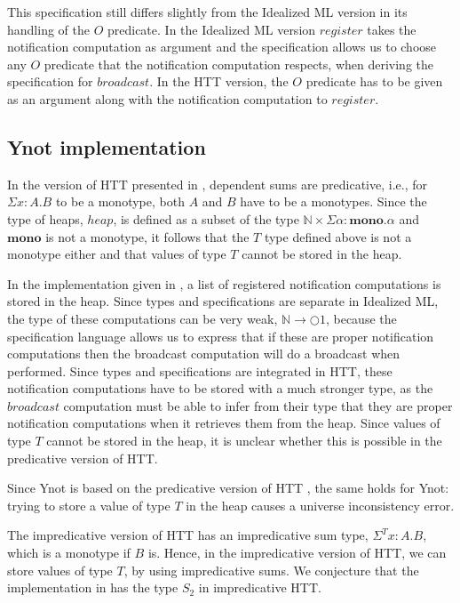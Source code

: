 \documentclass[a4paper,english]{article}
\newcommand{\N}[0]{\mathbb{N}}
\newcommand{\MONAD}[0]{\bigcirc}
\newcommand{\MONO}[0]{\mathbf{mono}}
\begin{document}
This specification still differs slightly from the Idealized ML version in its
handling of the $O$ predicate. In the Idealized ML version $register$ takes the
notification computation as argument and the specification allows us to choose
any $O$ predicate that the notification computation respects, when deriving the
specification for $broadcast$. In the HTT version, the $O$ predicate has to be
given as an argument along with the notification computation to $register$. 

\subsection{Ynot implementation}

In the version of HTT presented in \cite{htthol-conf}, dependent sums are
predicative, i.e., for $\Sigma x : A. B$ to be a monotype, both $A$ and $B$
have to be a monotypes. Since the type of heaps, $heap$, is defined as a subset
of the type $\N \times \Sigma \alpha : \MONO. \alpha$ and $\MONO$ is not a
monotype, it follows that the $T$ type defined above is not a monotype either
and that values of type $T$ cannot be stored in the heap. 

In the implementation given in \cite{patterns}, a list of registered
notification computations is stored in the heap. Since types and specifications
are separate in Idealized ML, the type of these computations can be very weak,
$\N \rightarrow \MONAD 1$, because the specification language allows us to
express that if these are proper notification computations then the broadcast
computation will do a broadcast when performed. Since types and specifications
are integrated in HTT, these notification computations have to be stored with a
much stronger type, as the $broadcast$ computation must be able to infer from
their type that they are proper notification computations when it retrieves
them from the heap. Since values of type $T$ cannot be stored in the heap, it
is unclear whether this is possible in the predicative version of HTT.

Since Ynot is based on the predicative version of HTT \cite{htthol-conf}, the
same holds for Ynot: trying to store a value of type $T$ in the heap causes a
universe inconsistency error. 

The impredicative version of HTT \cite{httmodel-conf} has an impredicative sum
type, $\Sigma^T x : A. B$, which is a monotype if $B$ is. Hence, in the
impredicative version of HTT, we can store values of type $T$, by using
impredicative sums. We conjecture that the implementation in \cite{patterns}
has the type $S_2$ in impredicative HTT. 
\end{document}
